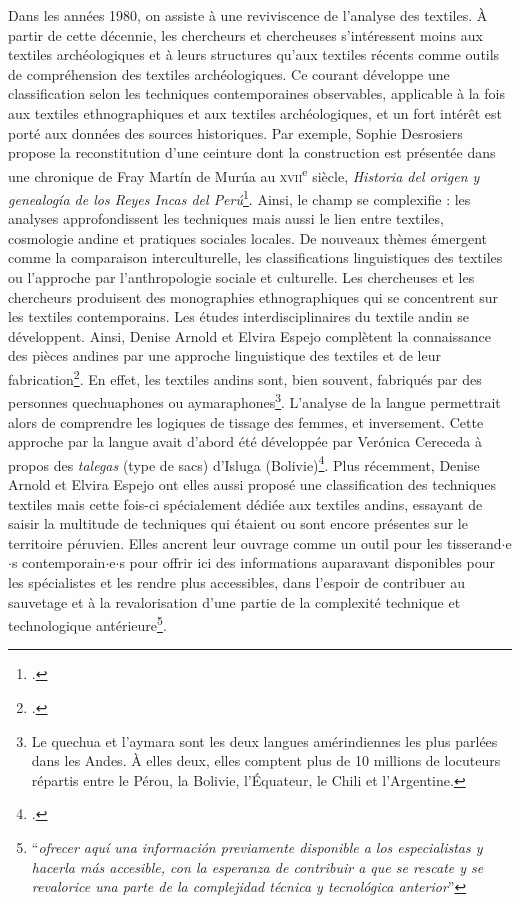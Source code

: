 \documentclass[a4paper, twoside, 12pt]{book}
\newcommand{\inclusives}[1]{$\cdot${#1}$\cdot${s}}
\newcommand{\siecle}[1]{\textsc{#1}\textsuperscript{e} siècle}
\begin{document}
Dans les années 1980, on assiste à une reviviscence de l'analyse des textiles. À partir de cette décennie, les chercheurs et chercheuses s'intéressent moins aux textiles archéologiques et à leurs structures qu'aux textiles récents comme outils de compréhension des textiles archéologiques. Ce courant développe une classification selon les techniques contemporaines observables, applicable à la fois aux textiles ethnographiques et aux textiles archéologiques, et un fort intérêt est porté aux données des sources historiques. Par exemple, Sophie Desrosiers propose la reconstitution d'une ceinture dont la construction est présentée dans une chronique de Fray Martín de Murúa  au \siecle{xvii}, \textit{Historia del origen y genealogía de los Reyes Incas del Perú}\footcite{desrosiersExperienceTechnologieReconstruction1986}. Ainsi, le champ se complexifie : les analyses approfondissent les techniques mais aussi le lien entre textiles, cosmologie andine et pratiques sociales locales. De nouveaux thèmes émergent comme la comparaison interculturelle, les classifications linguistiques des textiles ou l'approche par l'anthropologie sociale et culturelle. Les chercheuses et les chercheurs produisent des monographies ethnographiques qui se concentrent sur les textiles contemporains. Les études interdisciplinaires du textile andin se développent. 
Ainsi, Denise Arnold et Elvira Espejo complètent la connaissance des pièces andines par une approche linguistique des textiles et de leur fabrication\footcite{arnoldHaciaTerminologiaAndina2011}. En effet, les textiles andins sont, bien souvent, fabriqués par des personnes quechuaphones ou aymaraphones\footnote{Le quechua et l'aymara sont les deux langues amérindiennes les plus parlées dans les Andes. À elles deux, elles comptent plus de 10 millions de locuteurs répartis entre le Pérou, la Bolivie, l'Équateur, le Chili et l'Argentine.}. L'analyse de la langue permettrait alors de comprendre les logiques de tissage des femmes, et inversement. Cette approche par la langue avait d'abord été développée par Verónica Cereceda à propos des \textit{talegas} (type de sacs) d'Isluga (Bolivie)\footcite{cerecedaSemiologieTissusAndins1978}. Plus récemment, Denise Arnold et Elvira Espejo ont elles aussi proposé une classification des techniques textiles mais cette fois-ci spécialement dédiée aux textiles andins, essayant de saisir la multitude de techniques qui étaient ou sont encore présentes sur le territoire péruvien. Elles ancrent leur ouvrage comme un outil pour les tisserand\inclusives{e} contemporain\inclusives{e} pour \og offrir ici des informations auparavant disponibles pour les spécialistes et les rendre plus accessibles, dans l'espoir de contribuer au sauvetage et à la revalorisation d'une partie de la complexité technique et technologique antérieure\footnote{\cite[p.~8]{arnoldCienciaTejerAndes2019} \textquotedblleft \textit{ofrecer aquí una información previamente disponible a los especialistas y hacerla más accesible, con la esperanza de contribuir a que se rescate y se revalorice una parte de la complejidad técnica y tecnológica anterior}''}.\fg \\
\end{document}
